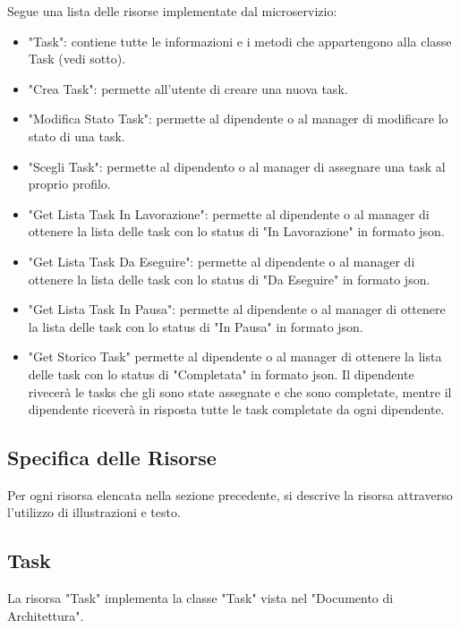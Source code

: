 \documentclass{report}
\begin{document}
Segue una lista delle risorse implementate dal microservizio:
\begin{itemize}
	\item "Task": contiene tutte le informazioni e i metodi che appartengono alla classe Task (vedi sotto).
	\item "Crea Task": permette all'utente di creare una nuova task.
	\item "Modifica Stato Task": permette al dipendente o al manager di modificare lo stato di una task.
	\item "Scegli Task": permette al dipendento o al manager di assegnare una task al proprio profilo.
	\item "Get Lista Task In Lavorazione": permette al dipendente o al manager di ottenere la lista delle task con lo status di "In Lavorazione" in formato json.
	\item "Get Lista Task Da Eseguire": permette al dipendente o al manager di ottenere la lista delle task con lo status di "Da Eseguire" in formato json.
	\item "Get Lista Task In Pausa": permette al dipendente o al manager di ottenere la lista delle task con lo status di "In Pausa" in formato json.
	\item "Get Storico Task" permette al dipendente o al manager di ottenere la lista delle task con lo status di "Completata" in formato json. Il dipendente rivecerà le tasks che gli sono state assegnate e che sono completate, mentre il dipendente riceverà in risposta tutte le task completate da ogni dipendente.
\end{itemize}

\subsection{Specifica delle Risorse}

Per ogni risorsa elencata nella sezione precedente, si descrive la risorsa attraverso l'utilizzo di illustrazioni e testo.

\subsection*{Task}

La risorsa "Task" implementa la classe "Task" vista nel "Documento di Architettura".
\end{document}
